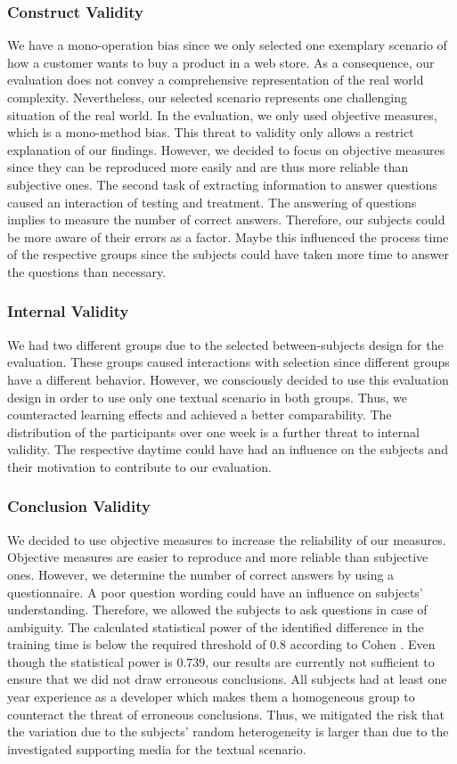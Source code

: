 \documentclass[conference]{IEEEtran}
\begin{document}
\subsubsection{Construct Validity}
We have a mono-operation bias since we only selected one exemplary scenario of 
how a customer wants to buy a product in a web store. As a consequence, our 
evaluation does not convey a comprehensive representation of the real world 
complexity. Nevertheless, our selected scenario represents one challenging 
situation of the real world. In the evaluation, we only used objective 
measures, which is a mono-method bias. This threat to validity only allows a 
restrict explanation of our findings. However, we decided to focus on objective 
measures since they can be reproduced more easily and are thus more reliable 
than subjective ones. The second task of extracting information to answer 
questions caused an interaction of testing and treatment. The answering of 
questions implies to measure the number of correct answers. Therefore, our 
subjects could be more aware of their errors as a factor. Maybe this influenced 
the process time of the respective groups since the subjects could have taken 
more time to answer the questions than necessary.

\subsubsection{Internal Validity}
We had two different groups due to the selected between-subjects design for the 
evaluation. These groups caused interactions with selection since different 
groups have a different behavior. However, we consciously decided to use this 
evaluation design in order to use only one textual scenario in both groups. 
Thus, we counteracted learning effects and achieved a better comparability. 
The distribution of the participants over one week is a further threat to 
internal validity. The respective daytime could have had an influence on the 
subjects and their motivation to contribute to our evaluation.

\subsubsection{Conclusion Validity}
We decided to use objective measures to increase the reliability of our 
measures. Objective measures are easier to reproduce and more reliable than 
subjective ones. However, we determine the number of correct answers by using a 
questionnaire. A poor question wording could have an influence on subjects' 
understanding. Therefore, we allowed the subjects to ask questions in case of 
ambiguity. The calculated statistical power of the identified difference in the 
training time is below the required threshold of $0.8$ according to Cohen 
\cite{Cohen.2009}. Even though the statistical power is $0.739$, our results 
are currently not sufficient to ensure that we did not draw erroneous 
conclusions. All subjects had at least one year experience as a developer which 
makes them a homogeneous group to counteract the threat of erroneous 
conclusions. Thus, we mitigated the risk that the variation due to the 
subjects' random heterogeneity is larger than due to the investigated 
supporting media for the textual scenario.
\end{document}
